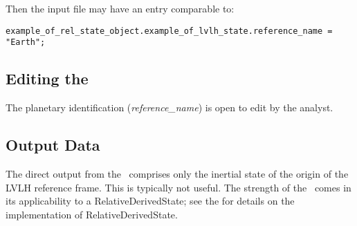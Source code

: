 Then the input file may have an entry comparable to:
\begin{verbatim}
example_of_rel_state_object.example_of_lvlh_state.reference_name = "Earth";
\end{verbatim}


\subsection{Editing the \LVLHDesc}
The planetary identification (\textit{reference\_name}) is open to edit by the analyst.

\subsection{Output Data}
The direct output from the \LVLHDesc\ comprises only the inertial state of the origin of the LVLH reference frame.  This is typically not useful.  The strength of the \LVLHDesc\ comes in its applicability to a RelativeDerivedState; see the  for details on the implementation of RelativeDerivedState.

